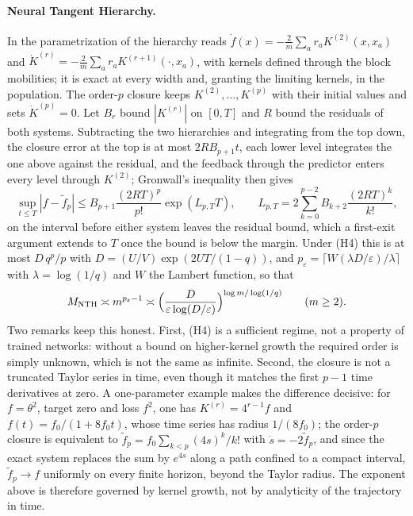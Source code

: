 \documentclass[11pt]{article}
\theoremstyle{definition}
\theoremstyle{remark}
\begin{document}
\paragraph{Neural Tangent Hierarchy.}
In the parametrization of  the hierarchy reads
$\dot f(x)=-\frac2m\sum_ar_aK^{(2)}(x,x_a)$ and
$\dot K^{(r)}=-\frac2m\sum_ar_aK^{(r+1)}(\cdot,x_a)$, with kernels defined
through the block mobilities; it is exact at every width and, granting the
limiting kernels, in the population.  The order-$p$ closure keeps
$K^{(2)},\dots,K^{(p)}$ with their initial values and sets $\dot K^{(p)}=0$.
Let $B_r$ bound $|K^{(r)}|$ on $[0,T]$ and $R$ bound the residuals of both
systems.  Subtracting the two hierarchies and integrating from the top down,
the closure error at the top is at most $2RB_{p+1}t$, each lower level
integrates the one above against the residual, and the feedback through the
predictor enters every level through $K^{(2)}$; Gronwall's inequality then
gives
\[
 \sup_{t\le T}|f-\tilde f_p|\le
 B_{p+1}\frac{(2RT)^p}{p!}\exp(L_{p,T}T),\qquad
 L_{p,T}=2\sum_{k=0}^{p-2}B_{k+2}\frac{(2RT)^k}{k!},
\]
on the interval before either system leaves the residual bound, which a
first-exit argument extends to $T$ once the bound is below the margin.  Under
(H4) this is at most $D\,q^p/p$ with $D=(U/V)\exp(2UT/(1-q))$, and
$p_\varepsilon=\lceil W(\lambda D/\varepsilon)/\lambda\rceil$ with
$\lambda=\log(1/q)$ and $W$ the Lambert function, so that
\[
 M_{\rm NTH}\asymp m^{p_\varepsilon-1}
 \asymp\Bigl(\frac{D}{\varepsilon\log(D/\varepsilon)}\Bigr)^{\log m/\log(1/q)}
 \qquad(m\ge2).
\]
Two remarks keep this honest.  First, (H4) is a sufficient regime, not a
property of trained networks: without a bound on higher-kernel growth the
required order is simply unknown, which is not the same as infinite.  Second,
the closure is not a truncated Taylor series in time, even though it matches
the first $p-1$ time derivatives at zero.  A one-parameter example makes the
difference decisive: for $f=\theta^2$, target zero and loss $f^2$, one has
$K^{(r)}=4^{r-1}f$ and $f(t)=f_0/(1+8f_0t)$, whose time series has radius
$1/(8f_0)$; the order-$p$ closure is equivalent to
$\tilde f_p=f_0\sum_{k<p}(4s)^k/k!$ with $\dot s=-2\tilde f_p$, and since the
exact system replaces the sum by $e^{4s}$ along a path confined to a compact
interval, $\tilde f_p\to f$ uniformly on every finite horizon, beyond the
Taylor radius.  The exponent above is therefore governed by kernel growth, not
by analyticity of the trajectory in time.
\end{document}

